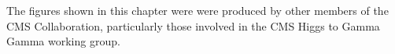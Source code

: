 The figures shown in this chapter were were produced by other members of the CMS Collaboration, particularly those involved in the CMS Higgs to Gamma Gamma working group.
